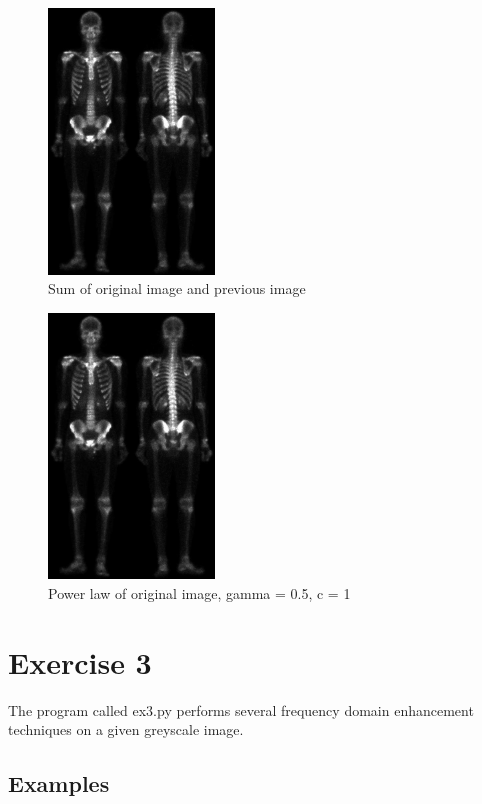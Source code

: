 \documentclass[10pt]{article}
\begin{document}
\begin{figure}[!ht]
	\centering
	\includegraphics[height=200pt]{./ex2/skeleton_final.jpg}
	\caption{Sum of original image and previous image}
\end{figure}
\begin{figure}[!ht]
	\centering
	\includegraphics[height=200pt]{./ex2/skeleton_final.jpg}
	\caption{Power law of original image, gamma = 0.5, c = 1}
\end{figure}

\clearpage

\section{Exercise 3}
The program called ex3.py performs several frequency domain enhancement techniques on a given greyscale image.
\subsection{Examples}
\end{document}
